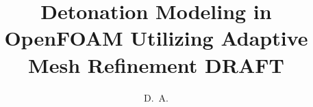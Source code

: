 \documentclass[defaultstyle,12pt]{thesis}
\title{Detonation Modeling in OpenFOAM Utilizing Adaptive Mesh Refinement {\color{red} DRAFT}}
\author{D.~A.}{McGough}
\begin{document}
 





%

\nocite{*}		%

\appendix

%
\end{document}

